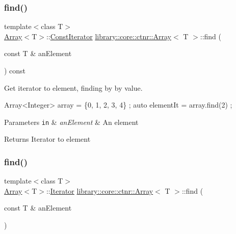 \subsubsection{\texorpdfstring{find()}{find()}\hspace{0.1cm}{\footnotesize\ttfamily [1/2]}}
{\footnotesize\ttfamily template$<$class T$>$ \\
\hyperlink{classlibrary_1_1core_1_1ctnr_1_1_array}{Array}$<$T$>$\+::\hyperlink{classlibrary_1_1core_1_1ctnr_1_1_array_ac26454f2a2ad4013873386a70aa25fc4}{Const\+Iterator} \hyperlink{classlibrary_1_1core_1_1ctnr_1_1_array}{library\+::core\+::ctnr\+::\+Array}$<$ T $>$\+::find (\begin{DoxyParamCaption}\item[{const T \&}]{an\+Element }\end{DoxyParamCaption}) const}



Get iterator to element, finding by by value. 


\begin{DoxyCode}
Array<Integer> array = \{0, 1, 2, 3, 4\} ;
\textcolor{keyword}{auto} elementIt = array.find(2) ;
\end{DoxyCode}



\begin{DoxyParams}[1]{Parameters}
\mbox{\tt in}  & {\em an\+Element} & An element \\
\hline
\end{DoxyParams}
\begin{DoxyReturn}{Returns}
Iterator to element 
\end{DoxyReturn}
\mbox{\label{classlibrary_1_1core_1_1ctnr_1_1_array_afece85f642e3c623bac197e25ad2d4ec}} 
\subsubsection{\texorpdfstring{find()}{find()}\hspace{0.1cm}{\footnotesize\ttfamily [2/2]}}
{\footnotesize\ttfamily template$<$class T$>$ \\
\hyperlink{classlibrary_1_1core_1_1ctnr_1_1_array}{Array}$<$T$>$\+::\hyperlink{classlibrary_1_1core_1_1ctnr_1_1_array_a2364a34e7bc76d3661c3d89c4729a0e4}{Iterator} \hyperlink{classlibrary_1_1core_1_1ctnr_1_1_array}{library\+::core\+::ctnr\+::\+Array}$<$ T $>$\+::find (\begin{DoxyParamCaption}\item[{const T \&}]{an\+Element }\end{DoxyParamCaption})}



